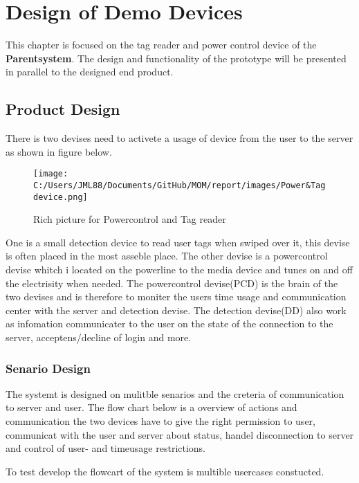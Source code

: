 \chapter{Design of Demo Devices}
This chapter is focused on the tag reader and power control device of the \textbf{Parentsystem}. 
The design and functionality of the prototype will be presented in parallel to the designed end product.

\section{Product Design}

There is two devises need to activete a usage of device from the user to the server as shown in figure below.

\begin{figure}[h]
	\centering
		\texttt{[image: C:/Users/JML88/Documents/GitHub/MOM/report/images/Power\&Tagdevice.png]}
	\caption{Rich picture for Powercontrol and Tag reader}
	\label{fig:Power&Tagdevice}
\end{figure}

One is a small detection device to read user tags when swiped over it, this devise is often placed in the most asseble place. 
The other devise is a powercontrol devise whitch i located on the powerline to the media device and tunes on and off the electrisity when needed.
The powercontrol devise(PCD) is the brain of the two devises and is therefore to moniter the users time usage and communication center with the server and detection devise. 
The detection devise(DD) also work as infomation communicater to the user on the state of the connection to the server, acceptens/decline of login and more.     

\subsection{Senario Design}

The systemt is designed on mulitble senarios and the creteria of communication to server and user. The flow chart below is a overview of actions and communication the two devices have to give the right permission to user, communicat with the user and server about status, handel disconnection to server and control of user- and timeusage restrictions.


To test develop the flowcart of the system is multible usercases constucted.

